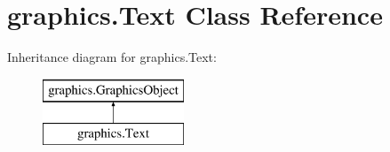 \hypertarget{classgraphics_1_1_text}{}\section{graphics.\+Text Class Reference}
\label{classgraphics_1_1_text}
Inheritance diagram for graphics.\+Text\+:\begin{figure}[H]
\begin{center}
\leavevmode
\includegraphics[height=2.000000cm]{classgraphics_1_1_text}
\end{center}
\end{figure}
